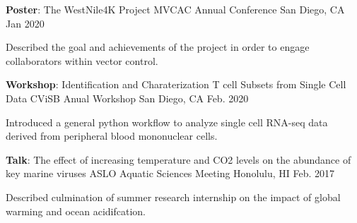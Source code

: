 
\begin{cventries}
  \cventry
    {\textbf{Poster}: The WestNile4K Project} %
    {MVCAC Annual Conference} %
    {San Diego, CA} %
    {Jan 2020} %
    {
      \begin{cvitems} %
        \item {Described the goal and achievements of the project in order to engage collaborators within vector control.}
      \end{cvitems}
    }

  \cventry
    {\textbf{Workshop}: Identification and Charaterization T cell Subsets from Single Cell Data} %
    {CViSB Anual Workshop} %
    {San Diego, CA} %
    {Feb. 2020} %
    {
      \begin{cvitems} %
        \item {Introduced a general python workflow to analyze single cell RNA-seq data derived from peripheral blood mononuclear cells.}
      \end{cvitems}
    }

  \cventry
    {\textbf{Talk}: The effect of increasing temperature and CO2 levels on the abundance of key marine viruses} %
    {ASLO Aquatic Sciences Meeting} %
    {Honolulu, HI} %
    {Feb. 2017} %
    {
      \begin{cvitems} %
        \item {Described culmination of summer research internship on the impact of global warming and ocean acidifcation.}
      \end{cvitems}
    }

\end{cventries}
